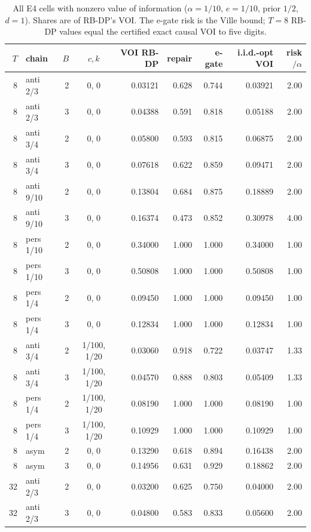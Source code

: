 \documentclass{article}
\theoremstyle{plain}
\theoremstyle{definition}
\theoremstyle{remark}
\begin{document}
\begin{longtable}{rlrcrrrrr}
\caption{All E4 cells with nonzero value of information ($\alpha=1/10$, $e=1/10$, prior $1/2$, $d=1$). Shares are of RB-DP's VOI. The e-gate risk is the Ville bound; $T=8$ RB-DP values equal the certified exact causal VOI to five digits.}\\
\toprule
$T$ & chain & $B$ & $c,k$ & VOI RB-DP & repair & e-gate & i.i.d.-opt VOI & risk$/\alpha$\\
\midrule
\endhead
8 & anti 2/3 & 2 & 0, 0 & 0.03121 & 0.628 & 0.744 & 0.03921 & 2.00\\
8 & anti 2/3 & 3 & 0, 0 & 0.04388 & 0.591 & 0.818 & 0.05188 & 2.00\\
8 & anti 3/4 & 2 & 0, 0 & 0.05800 & 0.593 & 0.815 & 0.06875 & 2.00\\
8 & anti 3/4 & 3 & 0, 0 & 0.07618 & 0.622 & 0.859 & 0.09471 & 2.00\\
8 & anti 9/10 & 2 & 0, 0 & 0.13804 & 0.684 & 0.875 & 0.18889 & 2.00\\
8 & anti 9/10 & 3 & 0, 0 & 0.16374 & 0.473 & 0.852 & 0.30978 & 4.00\\
8 & pers 1/10 & 2 & 0, 0 & 0.34000 & 1.000 & 1.000 & 0.34000 & 1.00\\
8 & pers 1/10 & 3 & 0, 0 & 0.50808 & 1.000 & 1.000 & 0.50808 & 1.00\\
8 & pers 1/4 & 2 & 0, 0 & 0.09450 & 1.000 & 1.000 & 0.09450 & 1.00\\
8 & pers 1/4 & 3 & 0, 0 & 0.12834 & 1.000 & 1.000 & 0.12834 & 1.00\\
8 & anti 3/4 & 2 & 1/100, 1/20 & 0.03060 & 0.918 & 0.722 & 0.03747 & 1.33\\
8 & anti 3/4 & 3 & 1/100, 1/20 & 0.04570 & 0.888 & 0.803 & 0.05409 & 1.33\\
8 & pers 1/4 & 2 & 1/100, 1/20 & 0.08190 & 1.000 & 1.000 & 0.08190 & 1.00\\
8 & pers 1/4 & 3 & 1/100, 1/20 & 0.10929 & 1.000 & 1.000 & 0.10929 & 1.00\\
8 & asym & 2 & 0, 0 & 0.13290 & 0.618 & 0.894 & 0.16438 & 2.00\\
8 & asym & 3 & 0, 0 & 0.14956 & 0.631 & 0.929 & 0.18862 & 2.00\\
32 & anti 2/3 & 2 & 0, 0 & 0.03200 & 0.625 & 0.750 & 0.04000 & 2.00\\
32 & anti 2/3 & 3 & 0, 0 & 0.04800 & 0.583 & 0.833 & 0.05600 & 2.00\\

\end{longtable}
\end{document}
